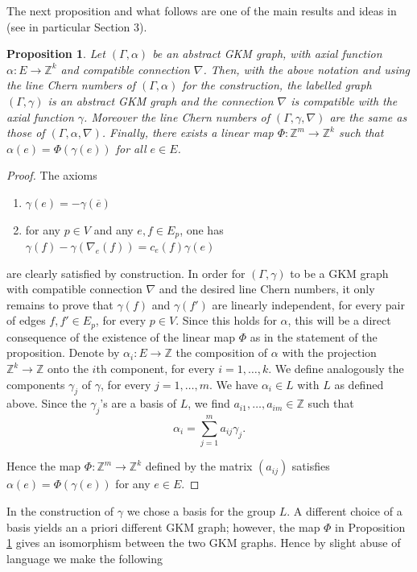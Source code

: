 \documentclass[12pt,a4paper]{amsart}
\newcommand{\ZZ}{\mathbb{Z}}
\newtheorem{prop}[thm]{Proposition}
\theoremstyle{plain}
\theoremstyle{definition}
\begin{document}
The next proposition and what follows are one of the main results and ideas in \cite{MR3943448} (see in particular Section 3).
\begin{prop}\label{prop: maxextension}
Let $(\Gamma, \alpha)$ be an abstract GKM graph, with axial function $\alpha\colon E\rightarrow
\ZZ^k$ and compatible connection $\nabla$. Then, with the above notation
and using the line Chern numbers of $(\Gamma,\alpha)$ for the
construction, the labelled graph
$(\Gamma,\gamma)$ is an abstract GKM graph and the connection $\nabla$ is compatible with the axial function $\gamma$.
Moreover the line Chern numbers of $(\Gamma,\gamma,\nabla)$ are the same as those of
$(\Gamma,\alpha,\nabla)$. 
Finally, there exists a linear map 
$\Phi\colon \ZZ^m\rightarrow \ZZ^k$ such that $\alpha(e) = \Phi(\gamma(e))$ for all $e\in E$.
\end{prop}

\begin{proof}
The axioms
\begin{enumerate}
\item $\gamma(e)=-\gamma(\overline{e})$
\item for any $p\in V$ and any $e,f\in E_p$, one has $\gamma(f)- \gamma(\nabla_e(f))=c_e(f)\gamma(e)\,$
\end{enumerate}
are clearly satisfied by construction. In order for $(\Gamma,\gamma)$ to be a GKM graph with compatible connection $\nabla$ and the desired line Chern numbers, it only remains to prove that $\gamma(f)$ and $\gamma(f')$ are linearly independent, for every pair of edges $f,f'\in E_p$, for every $p\in V$.
Since this holds for $\alpha$, this will be a direct consequence of the existence of the linear map $\Phi$ as in the statement of the proposition. Denote by $\alpha_i\colon E\rightarrow \ZZ$ the composition of $\alpha$ with the projection $\ZZ^k\rightarrow \ZZ$ onto the $i$th component, for every $i=1,\ldots,k$. We define analogously the components $\gamma_j$ of $\gamma$, for every $j=1,\ldots,m$. 
We have $\alpha_i\in L$ with $L$ as defined above. Since the $\gamma_j$'s are a basis of $L$, we find $a_{i1},\ldots,a_{im}\in \ZZ$ such that
\[\alpha_i=\sum_{j=1}^m a_{ij} \gamma_j.\]

Hence the map $\Phi\colon \ZZ^m\rightarrow \ZZ^k$ defined by the matrix $(a_{ij})$ satisfies $\alpha(e)=\Phi(\gamma(e))$ for any $e\in E$.
\end{proof}

In the construction of $\gamma$ we chose a basis for the group $L$. A different choice of a basis yields an a priori different GKM graph; however,
the map $\Phi$ in Proposition \ref{prop: maxextension} gives an isomorphism between the two GKM graphs.
Hence by slight abuse of language we make the following
\end{document}
